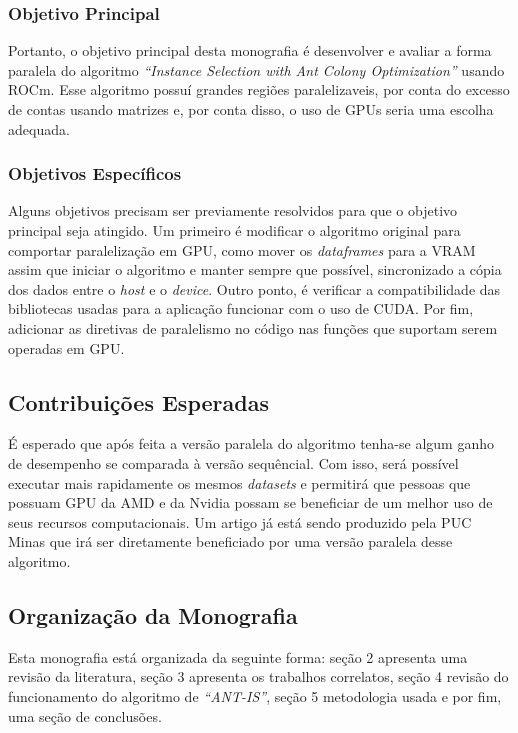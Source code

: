 \subsubsection{Objetivo Principal}

Portanto, o objetivo principal desta monografia é desenvolver e avaliar a forma paralela do algoritmo \emph{``Instance Selection with Ant Colony
Optimization''} usando {ROCm}. Esse algoritmo possuí grandes regiões paralelizaveis, por conta do excesso de
contas usando matrizes e, por conta disso, o uso de GPUs seria uma escolha adequada.


\subsubsection{Objetivos Específicos}
Alguns objetivos precisam ser previamente resolvidos para que o objetivo principal seja atingido. Um primeiro é modificar
o algoritmo original para comportar paralelização em GPU, como mover os \emph{dataframes} para a {VRAM} assim que
iniciar o algoritmo e manter sempre que possível, sincronizado a cópia dos dados entre o \emph{host} e o \emph{device}.
Outro ponto, é verificar a compatibilidade das bibliotecas usadas para a aplicação funcionar com o uso de {CUDA}.
Por fim, adicionar as diretivas de paralelismo no código nas funções que suportam serem operadas em GPU.

\subsection{Contribuições Esperadas}

É esperado que após feita a versão paralela do algoritmo tenha-se algum ganho de desempenho se comparada à versão
sequêncial. Com isso, será possível executar mais rapidamente os mesmos \emph{datasets} e permitirá que pessoas que
possuam GPU da AMD e da Nvidia possam se beneficiar de um melhor uso de seus recursos computacionais. Um artigo
já está sendo produzido pela PUC Minas que irá ser diretamente beneficiado por uma versão paralela desse algoritmo.

\subsection{Organização da Monografia}

Esta monografia está organizada da seguinte forma: seção 2 apresenta uma revisão da literatura,
seção 3 apresenta os trabalhos correlatos, seção 4 revisão do funcionamento do algoritmo de
\emph{``ANT-IS''}, seção 5 metodologia usada e por fim, uma seção de conclusões.
